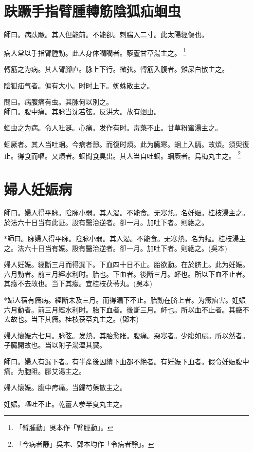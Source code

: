 \documentclass[12pt,twoside,UTF8,b5paper]{ctexbook}
\begin{document}
\chapter{趺蹶手指臂腫轉筋陰狐疝蛔虫}

師曰。病趺蹶。其人但能前。不能卻。刺腨入二寸。此太陽經傷也。

病人常以手指臂腫動。此人身体瞤瞤者。藜蘆甘草湯主之。
	\footnote{「臂腫動」吳本作「臂脛動」。}

轉筋之为病。其人臂腳直。脉上下行。微弦。轉筋入腹者。雞屎白散主之。

陰狐疝气者。偏有大小。时时上下。蜘蛛散主之。

問曰。病腹痛有虫。其脉何以別之。\\
師曰。腹中痛。其脉当沈若弦。反洪大。故有蛔虫。

蛔虫之为病。令人吐涎。心痛。发作有时。毒藥不止。甘草粉蜜湯主之。

蛔厥者。其人当吐蛔。今病者靜。而復时煩。此为臓寒。蛔上入膈。故煩。須臾復止。得食而嘔。又煩者。蛔聞食臭出。其人当自吐蛔。蛔厥者。烏梅丸主之。
	\footnote{「今病者靜」吳本、鄧本均作「令病者靜」。}

\chapter{婦人妊娠病}

師曰。婦人得平脉。陰脉小弱。其人渴。不能食。无寒熱。名妊娠。桂枝湯主之。於法六十日当有此証。設有醫治逆者。卻一月。加吐下者。則絶之。

*師曰。脉婦人得平脉。陰脉小弱。其人渴。不能食。无寒熱。名为軀。桂枝湯主之。法六十日当有娠。設有醫治逆者。卻一月。加吐下者。則絶之。(吳本)

婦人妊娠。經斷三月而得漏下。下血四十日不止。胎欲動。在於脐上。此为妊娠。六月動者。前三月經水利时。胎也。下血者。後斷三月。衃也。所以下血不止者。其癥不去故也。当下其癥。宜桂枝茯苓丸。(吳本)

*婦人宿有癥病。經斷未及三月。而得漏下不止。胎動在脐上者。为癥痼害。妊娠六月動者。前三月經水利时。胎下血者。後斷三月。衃也。所以血不止者。其癥不去故也。当下其癥。桂枝茯苓丸主之。(鄧本)

婦人懷娠六七月。脉弦。发熱。其胎愈胀。腹痛。惡寒者。少腹如扇。所以然者。子臓開故也。当以附子湯温其臓。

師曰。婦人有漏下者。有半產後因續下血都不絶者。有妊娠下血者。假令妊娠腹中痛。为胞阻。膠艾湯主之。

婦人懷娠。腹中㽲痛。当歸芍藥散主之。

妊娠。嘔吐不止。乾薑人参半夏丸主之。
\end{document}
